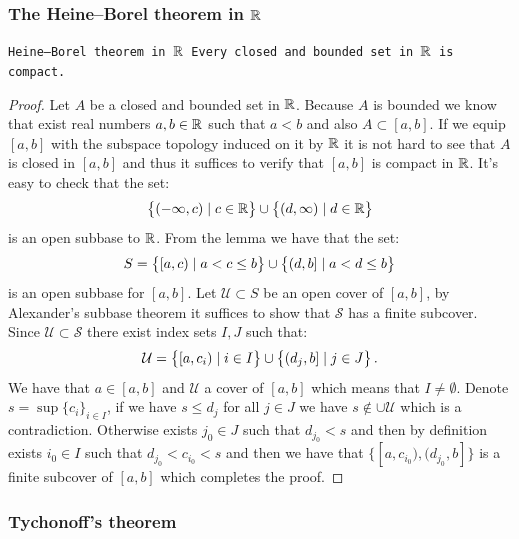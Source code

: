 \documentclass[11pt,a4paper]{article}
\begin{document}
\subsubsection{The Heine--Borel theorem in \texorpdfstring{$\mathbb{R}$}{R}}

\begin{theorem}
  \tt{Heine--Borel theorem in $\mathbb{R}$}
  Every closed and bounded set in $\mathbb{R}$ is compact.
\end{theorem}
\begin{proof}
  Let $A$ be a closed and bounded set in $\mathbb{R}$. Because $A$ is bounded
  we know that exist real numbers $a,b \in \mathbb{R}$ such that $a < b$ and
  also $A \subset [a,b]$. If we equip $[a,b]$ with the subspace
  topology induced on it by $\mathbb{R}$ it is not hard to see that $A$ is
  closed in $[a,b]$ and thus it suffices to verify that $[a,b]$
  is compact in $\mathbb{R}$. It's easy to check that the set:
  \[
    \left\{(-\infty, c) \mid c \in \mathbb{R}\right\} \cup 
    \left\{(d, \infty) \mid d \in \mathbb{R}\right\}
  \]
  is an open subbase to $\mathbb{R}$. From the lemma we have that the set:
  \[
    S = \left\{[a, c) \mid a < c \le b\right\} \cup 
    \left\{(d, b] \mid a < d \le b\right\}
  \]
  is an open subbase for $[a,b]$. Let $\mathcal{U} \subset S$ be an
  open cover of $[a,b]$, by Alexander's subbase theorem it suffices
  to show that $\mathcal{S}$ has a finite subcover. Since 
  $\mathcal{U} \subset \mathcal{S}$ there exist index sets $I,J$ such 
  that:
  \[
    \mathcal{U} = 
    \left\{[a,c_i) \mid i \in I\right\} \cup \left\{(d_j,b] \mid j \in J\right\}.
  \]
  We have that $a \in [a,b]$ and $\mathcal{U}$ a cover of $[a,b]$
  which means that $I \neq \emptyset$. 
  Denote $s = \sup\{c_i\}_{i\in I}$,  if we have $s \le d_j$ for
  all $j \in J$ we have $s \notin \cup\mathcal{U}$ which is a 
  contradiction. Otherwise exists $j_0 \in J$ such that 
  $d_{j_0} < s$ and then by definition exists $i_0 \in I$ such that
  $d_{j_0} < c_{i_0} < s$ and then we have that 
  $\{[a,c_{i_0}), (d_{j_0},b]\}$ is a finite subcover of $[a,b]$ which
  completes the proof.
\end{proof}

\subsubsection{Tychonoff's theorem}
\end{document}

